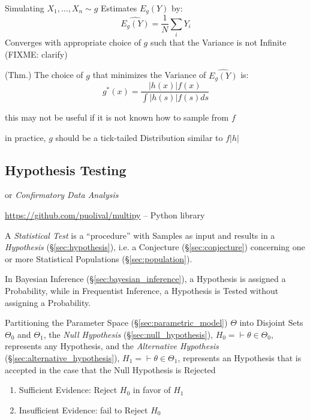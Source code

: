 Simulating $X_1, \ldots, X_n \sim g$ Estimates $E_g(Y)$ by:
\[
  \hat{E_g(Y)} = \frac{1}{N}\sum_i Y_i
\]
Converges with appropriate choice of $g$ such that the Variance is not Infinite
(FIXME: clarify)

(Thm.) The choice of $g$ that minimizes the Variance of $\hat{E_g(Y)}$ is:
\[
  g^*(x) = \frac{|h(x)| f(x)}{\int|h(s)| f(s) ds}
\]

this may not be useful if it is not known how to sample from $f$

in practice, $g$ should be a tick-tailed Distribution similar to $f|h|$



\subsection{Hypothesis Testing}\label{sec:hypothesis_testing}

or \emph{Confirmatory Data Analysis}

\url{https://github.com/puolival/multipy} -- Python library

A \emph{Statistical Test} is a ``procedure'' with Samples as input and results
in a \emph{Hypothesis} (\S\ref{sec:hypothesis}), i.e. a Conjecture
(\S\ref{sec:conjecture}) concerning one or more Statistical Populations
(\S\ref{sec:population}).

\fist In Bayesian Inference (\S\ref{sec:bayesian_inference}), a Hypothesis is
assigned a Probability, while in Frequentist Inference, a Hypothesis is Tested
without assigning a Probability.

Partitioning the Parameter Space (\S\ref{sec:parametric_model}) $\Theta$ into
Disjoint Sets $\Theta_0$ and $\Theta_1$, the \emph{Null Hypothesis}
(\S\ref{sec:null_hypothesis}), $H_0 = \vdash \theta \in \Theta_0$, represents
any Hypothesis, and the \emph{Alternative Hypothesis}
(\S\ref{sec:alternative_hypothesis}), $H_1 = \vdash \theta \in \Theta_1$,
represents an Hypothesis that is accepted in the case that the Null Hypothesis
is Rejected

\begin{enumerate}
  \item Sufficient Evidence: Reject $H_0$ in favor of $H_1$
  \item Insufficient Evidence: fail to Reject $H_0$
\end{enumerate}

